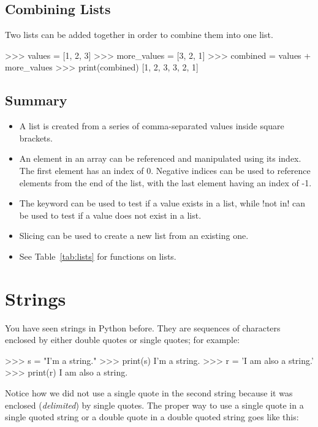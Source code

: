 \documentclass[11pt]{cselabheader}
\begin{document}
\subsection{Combining Lists}
Two lists can be added together in order to combine them into one list.

\begin{pyconcode}
>>> values = [1, 2, 3]
>>> more_values = [3, 2, 1]
>>> combined = values + more_values
>>> print(combined)
[1, 2, 3, 3, 2, 1]
\end{pyconcode}

\subsection{Summary}

\begin{itemize}
  \item A list is created from a series of comma-separated values inside square
    brackets.  
  \item An element in an array can be referenced and manipulated
    using its index. The first element has an index of 0. Negative indices can
    be used to reference elements from the end of the list, with the last
    element having an index of -1.
  \item The  keyword can be used to test if a value exists in a
    list, while \pythoninline!not in! can be used to test if a value does not exist
    in a list.
  \item Slicing can be used to create a new list from an existing one.
  \item See Table~\ref{tab:lists} for functions on lists.
\end{itemize}


\pagebreak
\section{Strings}

You have seen strings in Python before. They are sequences of characters
enclosed by either double quotes or single quotes; for example:

\begin{pyconcode}
>>> s = "I'm a string."
>>> print(s)
I'm a string.
>>> r = 'I am also a string.'
>>> print(r)
I am also a string.
\end{pyconcode}

Notice how we did not use a single quote in the second string because it was
enclosed (\emph{delimited}) by single quotes. The proper way to use a single
quote in a single quoted string or a double quote in a double quoted string
goes like this:
\end{document}
